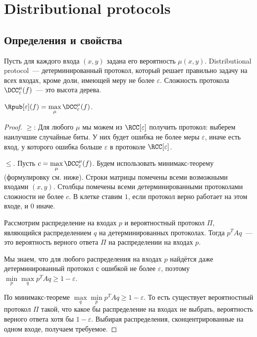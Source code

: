 
\section{Distributional protocols}

\subsection{Определения и свойства}

Пусть для каждого входа $(x, y)$ задана его вероятность $\mu(x, y)$. Distributional protocol~---
детерминированный протокол, который решает правильно задачу на всех входах, кроме доли, имеющей меру не
более $\varepsilon$. Сложность протокола $\DCC^{\mu}_{\varepsilon}(f)$~--- это высота дерева.

\begin{theorem}
    $\Rpub[\varepsilon](f) = \max\limits_{\mu} \DCC^{\mu}_{\varepsilon}(f)$.
\end{theorem}

\begin{proof}
    $\ge$: Для любого $\mu$ мы можем из $\RCC[\varepsilon]$ получить протокол: выберем наилучшие
    случайные биты. У них будет ошибка не более меры $\varepsilon$, иначе есть вход, у которого ошибка
    больше $\varepsilon$ в протоколе $\RCC[\varepsilon]$.

    $\le$. Пусть $c = \max\limits_{\mu} \DCC^{\mu}_{\varepsilon}(f)$. Будем использовать минимакс-теорему
    (формулировку см. ниже). Строки матрицы помечены всеми возможными входами $(x, y)$. Столбцы помечены
    всеми детерминированными протоколами сложности не более $c$. В клетке ставим $1$, если протокол верно
    работает на этом входе, и $0$ иначе.

    Рассмотрим распределение на входах $p$ и вероятностный протокол $\Pi$, являющийся распределением $q$
    на детерминированных протоколах. Тогда $p^TAq$~--- это вероятность верного ответа $\Pi$ на
    распределении на входах $p$.

    Мы знаем, что для любого распределения на входах $p$ найдётся даже детерминированный протокол с
    ошибкой не более $\varepsilon$, поэтому $\min\limits_p\max\limits_q p^TAq \ge 1 - \varepsilon$.

    По минимакс-теореме $\max\limits_q \min\limits_p p^TAq \ge 1 - \varepsilon$. То есть существует
    вероятностный протокол $\Pi$ такой, что какое бы распределение на входах не выбрать, вероятность
    верного ответа хотя бы $1 - \varepsilon$. Выбирая распределения, сконцентрированные на одном входе,
    получаем требуемое.
\end{proof}

